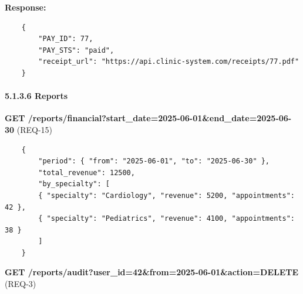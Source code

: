 \textbf{Response:}
\begin{verbatim}
	{
		"PAY_ID": 77,
		"PAY_STS": "paid",
		"receipt_url": "https://api.clinic-system.com/receipts/77.pdf"
	}
\end{verbatim}

\paragraph{5.1.3.6 \quad Reports}

\textbf{GET /reports/financial?start\_date=2025-06-01\&end\_date=2025-06-30} (REQ-15)

\begin{verbatim}
	{
		"period": { "from": "2025-06-01", "to": "2025-06-30" },
		"total_revenue": 12500,
		"by_specialty": [
		{ "specialty": "Cardiology", "revenue": 5200, "appointments": 42 },
		{ "specialty": "Pediatrics", "revenue": 4100, "appointments": 38 }
		]
	}
\end{verbatim}

\medskip
\textbf{GET /reports/audit?user\_id=42\&from=2025-06-01\&action=DELETE} (REQ-3)

